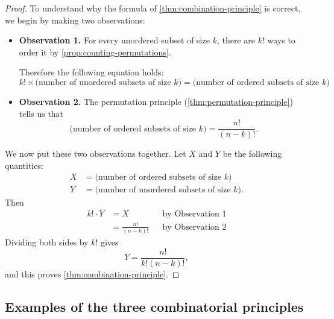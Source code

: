 \documentclass[10pt]{article}
\theoremstyle{definition}
\newcommand{\1}[1]{\textbf{1}_{\left[#1\right]}} %
\begin{document}
\begin{proof}
  To understand why the formula of \cref{thm:combination-principle} is
  correct, we begin by making two observations:
  \begin{itemize}
    \item \textbf{Observation 1.} For every unordered subset of size $k$,
    there are $k!$ ways to order it by \cref{prop:counting-permutations}.

    Therefore the following equation holds:
    \begin{equation*}
      k! \times \text{(number of unordered subsets of size $k$)}
      =
      \text{(number of ordered subsets of size $k$)}
    \end{equation*}
    
    \item \textbf{Observation 2.} The permutation principle
    (\cref{thm:permutation-principle}) tells us that
    \begin{equation*}
      \text{(number of ordered subsets of size $k$)}=\frac{n!}{(n-k)!}.
    \end{equation*}
  \end{itemize}

  We now put these two observations together. Let $X$ and $Y$ be the following
  quantities:
  \begin{align*}
    X &= \text{(number of ordered subsets of size $k$)}\\
    Y &= \text{(number of unordered subsets of size $k$)}.
  \end{align*}
  Then
  \begin{align*}
    k!\cdot Y
    &= X &&\text{by Observation 1}\\
    &= \frac{n!}{(n-k)!} &&\text{by Observation 2}
  \end{align*}
  Dividing both sides by $k!$ gives
  \begin{equation*}
    Y = \frac{n!}{k!(n-k)!},
  \end{equation*}
  and this proves \cref{thm:combination-principle}.
\end{proof}



\subsection{Examples of the three combinatorial principles}
\end{document}
